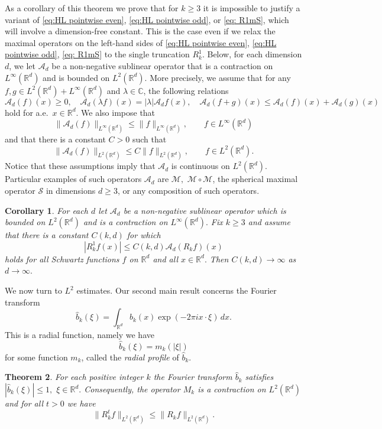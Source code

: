 \documentclass[a4paper,12pt,reqno]{amsart}
\numberwithin{equation}{section}
\newtheorem{theorem}{Theorem}[section]
\newtheorem{corollary}[theorem]{Corollary}
\theoremstyle{definition}
\newcommand{\C}{\mathbb{C}}
\newcommand{\R}{\mathbb{R}}
\newcommand{\mM}{\mathcal{M}}
\newcommand{\mA}{\mathcal{A}}
\renewcommand{\le}{\leqslant}
\renewcommand{\ge}{\geqslant}
\begin{document}
As a corollary of this theorem we prove that for $k\ge 3$ it is impossible to justify a variant of \eqref{eq:HL pointwise even}, \eqref{eq:HL pointwise odd}, or \eqref{eq: R1mS}, which will involve a dimension-free constant. This is the case even if we relax the maximal operators on the left-hand sides of \eqref{eq:HL pointwise even}, \eqref{eq:HL pointwise odd}, \eqref{eq: R1mS} to the single truncation $R_k^1.$ Below, for each dimension $d$, we let $\mA_d$ be a non-negative sublinear operator  that is a contraction on $L^{\infty}(\R^d)$ and is bounded on $L^2(\R^d).$ More precisely, we assume that for any $f,g\in L^2(\R^d)+L^{\infty}(\R^d)$ and $\lambda\in \C$, the following relations
\begin{equation*}
\mA_d(f)(x)\ge 0,\quad \mA_d(\lambda f)(x)=|\lambda| \mA_d f(x),\quad \mA_d(f+g)(x)\le \mA_d(f)(x)+\mA_d(g)(x)
\end{equation*}
hold for a.e.\ $x\in \R^d.$ We also impose that
\[
\|\mA_d(f)\|_{L^{\infty}(\R^d)}\le \|f\|_{L^{\infty}(\R^d)},\qquad f\in L^{\infty}(\R^d)
\]
and that there is a constant $C>0$ such that
\[
\|\mA_d(f)\|_{L^{2}(\R^d)}\le C\|f\|_{L^{2}(\R^d)},\qquad f\in L^{2}(\R^d).
\]
Notice that these assumptions imply that $\mA_d$ is continuous on $L^2(\R^d).$ Particular examples of such operators $\mA_d$ are $\mM,$ $\mM\circ \mM$, the spherical maximal operator $\mathcal S$ in dimensions $d\ge 3$, or any composition of such operators.
\begin{corollary}
\label{cor: bkL1}
For each $d$ let $\mA_d$ be a non-negative sublinear operator which is bounded on $L^2(\R^d)$ and is a contraction on $L^{\infty}(\R^d).$ Fix $k\ge 3$ and assume that there is a constant $C(k,d)$ for which
\[
|R_k^1 f(x)|\le C(k,d) \mA_d(R_k f)(x)
\]
holds for all Schwartz functions $f$ on $\R^d$ and all $x\in \R^d.$ Then $C(k,d)\to \infty$ as $d\to \infty.$
\end{corollary}

We now turn to $L^2$ estimates. Our second main result concerns the Fourier transform
\[\widehat{b}_k(\xi)=\int_{\R^d}b_k(x)\exp(-2\pi i x\cdot \xi)\,dx.\]
This is a radial function, namely we have
\[ \widehat{b}_k(\xi) = m_k(\lvert \xi \rvert) \]
for some function $m_k$, called the \emph{radial profile} of $\widehat{b}_k$.

\begin{theorem}
    \label{thm: fbk}
    For each positive integer $k$ the Fourier transform $\widehat{b}_k$ satisfies $|\widehat{b}_k(\xi)|\le 1,$ $\xi \in \R^d.$ Consequently, the operator $M_k$ is a contraction on $L^2(\R^d)$ and for all $t>0$ we have
\begin{equation}
\label{eq: RktRL2}
\|R_k^t f\|_{L^2(\R^d)}\le \|R_k f\|_{L^2(\R^d)}.
\end{equation}
\end{theorem}
\end{document}
